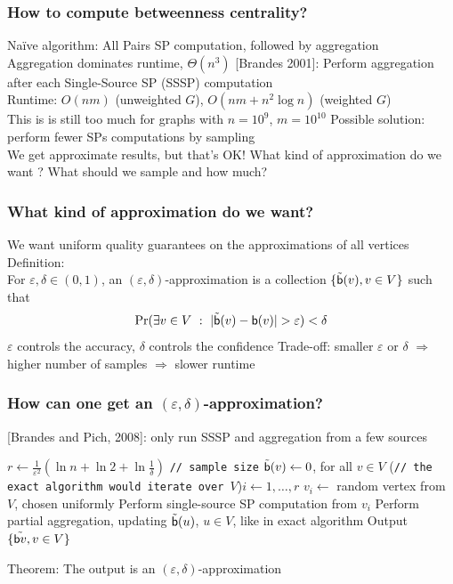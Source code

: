 \begin{frame}
  \frametitle{How to compute betweenness centrality?}
  Na\"ive algorithm: All Pairs SP computation, followed by aggregation\\
  \quad Aggregation dominates runtime, $\Theta(n^3)$
  \vfill
  [Brandes 2001]: Perform aggregation after each Single-Source SP (SSSP) computation\\
  \quad Runtime: $O(nm)$ (unweighted $G$), $O(nm + n^2\log n)$ (weighted
  $G$)\\
  This is is still too much for graphs with $n=10^9$, $m=10^10$
  \vfill
  Possible solution: perform fewer SPs computations by sampling\\
  \quad We get approximate results, but that's OK!
  \vfill
  What kind of approximation do we want ? What should we sample and how much?
\end{frame}

\begin{frame}
  \frametitle{What kind of approximation do we want?}
  We want uniform quality guarantees on the approximations of all vertices
  \vfill
  Definition:\\
  \quad For $\varepsilon,\delta\in(0,1)$, an $(\varepsilon,\delta)$-approximation is
  a collection $\{\tilde{\mathsf{b}}(v), v\in V\}$ such that
  \[
    \Pr(\exists v\in V ~:~ |\tilde{\betw}(v) -\betw(v)|>\varepsilon)<\delta
  \]
  $\varepsilon$ controls the accuracy, $\delta$ controls the confidence
  \vfill
  Trade-off: smaller $\varepsilon$ or $\delta$ $\Rightarrow$ higher number of
  samples $\Rightarrow$ slower runtime
\end{frame}

\begin{frame}
  \frametitle{How can one get an $(\varepsilon,\delta)$-approximation?}
  [Brandes and Pich, 2008]: only run SSSP and aggregation from a few sources
  \vfill
  \begin{algorithm}[H]
    \DontPrintSemicolon
    $r\leftarrow \frac{1}{\varepsilon^2}\left(\ln n + \ln 2 +
    \ln\frac{1}{\delta}\right)$ \texttt{// sample size}\;
    $\tilde{\mathsf{b}}(v)\leftarrow 0$, for all $v\in V$\;
    \For(\texttt{// the exact algorithm would iterate over $V$}){$i\leftarrow 1,\dotsc,r$} {
      $v_i \leftarrow$ random vertex from $V$, chosen uniformly\;
      Perform single-source SP computation from $v_i$\;
      Perform partial aggregation, updating $\tilde{\mathsf{b}}(u)$, $u\in V$,
      like in exact algorithm\;
    }
    Output $\{\tilde{\mathsf{b}{v}}, v\in V\}$\;
  \end{algorithm}
  \vfill
  Theorem: The output is an $(\varepsilon,\delta)$-approximation
\end{frame}

